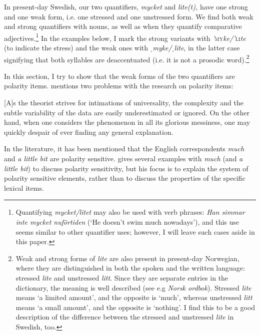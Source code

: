 \documentclass[output=paper]{langscibook}
\begin{document}
In present-day Swedish, our two quantifiers, \textit{mycket} and \textit{lite(t),} have one strong and one weak form, i.e. one stressed and one unstressed form. We find both weak and strong quantifiers with nouns, as well as when they quantify comparative adjectives.\footnote{Quantifying \textit{mycket/litet} may also be used with verb phrases: \textit{Han simmar inte mycket nuförtiden} (‘He doesn’t swim much nowadays’), and this use seems similar to other quantifier uses; however, I will leave such cases aside in this paper.} In the examples below, I mark the strong variants with \textit{’}\textsc{my}\textit{ke/’}\textsc{li}\textit{te} (to indicate the stress) and the weak ones with \textit{ˌmyke/ˌlite}, in the latter case signifying that both syllables are deaccentuated (i.e. it is not a prosodic word).\footnote{Weak and strong forms of \textit{lite} are also present in present-day Norwegian, where they are distinguished in both the spoken and the written language: stressed \textit{lite} and unstressed \textit{litt}. Since they are separate entries in the dictionary, the meaning is well described (see e.g \textit{Norsk ordbok}). Stressed \textit{lite} means ‘a limited amount’, and the opposite is ‘much’, whereas unstressed \textit{litt} means ‘a small amount’, and the opposite is ‘nothing’. I find this to be a good description of the difference between the stressed and unstressed \textit{lite} in Swedish, too.} 



In this section, I try to show that the weak forms of the two quantifiers are polarity items. \citet{Israel1996} mentions two problems with the research on polarity items:


[A]s the theorist strives for intimations of universality, the complexity and the subtle variability of the data are easily underestimated or ignored. On the other hand, when one considers the phenomenon in all its glorious messiness, one may quickly despair of ever finding any general explanation. \citep[619]{Israel1996}


In the literature, it has been mentioned that the English correspondents \textit{much} and \textit{a little bit} are polarity sensitive. \citet{Israel1996} gives several examples with \textit{much} (and \textit{a little bit}) to discuss polarity sensitivity, but his focus is to explain the system of polarity sensitive elements, rather than to discuss the properties of the specific lexical items.
\end{document}
